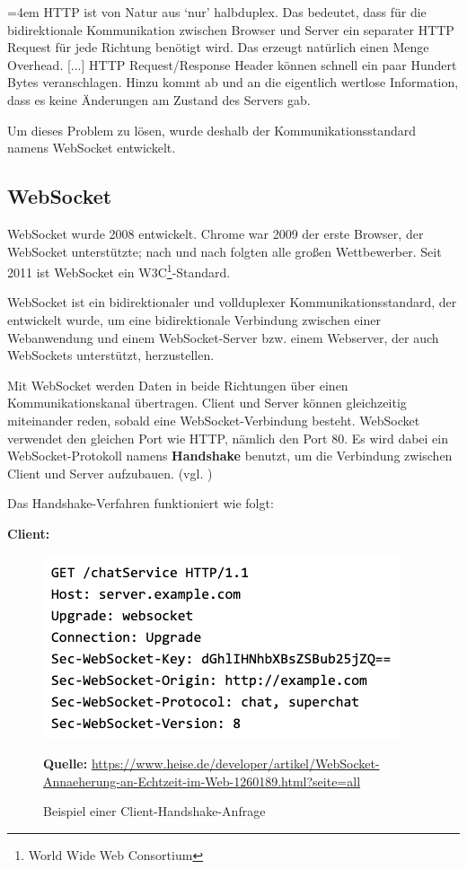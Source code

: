 \par
\begingroup
\leftskip=4em %
\rightskip\leftskip
\noindent \glqq HTTP ist von Natur aus ‘nur’ halbduplex. Das bedeutet, dass für die bidirektionale Kommunikation zwischen Browser und Server ein separater HTTP Request für jede Richtung benötigt wird. Das erzeugt natürlich einen Menge Overhead. [...] HTTP Request/Response Header können schnell ein paar Hundert Bytes veranschlagen. Hinzu kommt ab und an die eigentlich wertlose Information, dass es keine Änderungen am Zustand des Servers gab.\grqq{} \cite{Matt2011}
\par
\endgroup
\bigskip
Um dieses Problem zu lösen, wurde deshalb der Kommunikationsstandard namens WebSocket entwickelt.

\subsection{WebSocket}
\label{sec:websocket}
WebSocket wurde 2008 entwickelt. \glqq Chrome war 2009 der erste Browser, der WebSocket unterstützte; nach und nach folgten alle großen Wettbewerber. Seit 2011 ist WebSocket ein W3C\footnote{World Wide Web Consortium}-Standard.\grqq{} \cite{webSocket} \bigskip

WebSocket ist ein bidirektionaler und vollduplexer Kommunikationsstandard, der entwickelt wurde, \glqq[...] um eine bidirektionale Verbindung zwischen einer Webanwendung und einem WebSocket-Server bzw. einem Webserver, der auch WebSockets unterstützt, herzustellen.\grqq{} \cite{Wiki2019}\bigskip

Mit WebSocket werden Daten in beide Richtungen über einen Kommunikationskanal übertragen. Client und Server können gleichzeitig miteinander \glqq reden\grqq{}, sobald eine WebSocket-Verbindung besteht. WebSocket verwendet den gleichen Port wie HTTP, nämlich den Port 80. Es wird dabei ein WebSocket-Protokoll namens \textbf {Handshake} benutzt, um die Verbindung zwischen Client und Server aufzubauen. (vgl. \cite{Matt2011})

\newpage
Das Handshake-Verfahren funktioniert wie folgt:\bigskip

\textbf{Client:}

\begin{figure}[H]
  \begin{center}
    \includegraphics[scale=0.6]{img/clientWebsocket}
	\caption{Beispiel einer Client-Handshake-Anfrage}
	\footnotesize\sffamily\textbf{Quelle:} \url{https://www.heise.de/developer/artikel/WebSocket-Annaeherung-an-Echtzeit-im-Web-1260189.html?seite=all} 
	\label{fig:clientWebsocket}
  \end{center}   
\end{figure}

